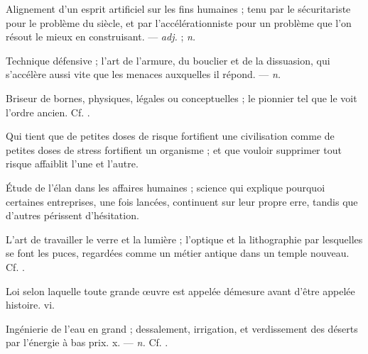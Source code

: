  Alignement d'un esprit artificiel sur les fins humaines ; tenu par le sécuritariste pour le problème du siècle, et par l'accélérationniste pour un problème que l'on résout le mieux en construisant. ---  \textit{adj.} ;  \textit{n.}

 Technique défensive ; l'art de l'armure, du bouclier et de la dissuasion, qui s'accélère aussi vite que les menaces auxquelles il répond. ---  \textit{n.}

 Briseur de bornes, physiques, légales ou conceptuelles ; le pionnier tel que le voit l'ordre ancien. Cf. .

 Qui tient que de petites doses de risque fortifient une civilisation comme de petites doses de stress fortifient un organisme ; et que vouloir supprimer tout risque affaiblit l'une et l'autre.

 Étude de l'élan dans les affaires humaines ; science qui explique pourquoi certaines entreprises, une fois lancées, continuent sur leur propre erre, tandis que d'autres périssent d'hésitation.

 L'art de travailler le verre et la lumière ; l'optique et la lithographie par lesquelles se font les puces, regardées comme un métier antique dans un temple nouveau. Cf. .

 Loi selon laquelle toute grande œuvre est appelée démesure avant d'être appelée histoire.   vi.

 Ingénierie de l'eau en grand ; dessalement, irrigation, et verdissement des déserts par l'énergie à bas prix.   x. ---  \textit{n.} Cf. .

